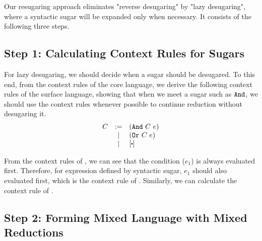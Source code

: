 Our resugaring approach eliminates "reverse desugaring" by "lazy desugaring", where a syntactic sugar will be expanded only when necessary. It consists of the following three steps.

\subsection*{Step 1: Calculating Context Rules for Sugars}

For lazy desugaring, we should decide when a sugar should be desugared. To this end, from the context rules of the core language, we derive the following context rules of the surface language, showing that when we meet a sugar such as $\mbox{\tt And}$, we should use the context rules whenever possible to continue reduction without desugaring it.
\[
\begin{array}{lcl}
C &:=& (\m{And}~C~e)\\
&|& (\m{Or}~C~e)\\
&|&[\bigcdot]\\
\end{array}
\]

From the context rules of , we can see that the condition ($e_1$) is always evaluated first. Therefore, for expression  defined by syntactic sugar, $e_1$ should also evaluated first, which is the context rule of . Similarly, we can calculate the context rule of .

\subsection*{Step 2: Forming Mixed Language with Mixed Reductions}

